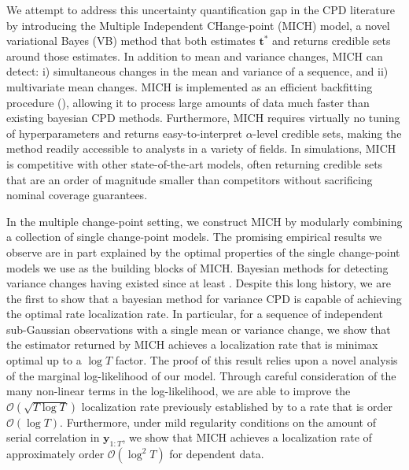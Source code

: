 
We attempt to address this uncertainty quantification gap in the CPD literature by introducing the Multiple Independent CHange-point (MICH) model, a novel variational Bayes (VB) method that both estimates $\mathbf{t}^*$ and returns credible sets around those estimates. In addition to mean and variance changes, MICH can detect: i) simultaneous changes in the mean and variance of a sequence, and ii) multivariate mean changes. MICH is implemented as an efficient backfitting procedure (\citealp{Friedman81, Breiman85}), allowing it to process large amounts of data much faster than existing bayesian CPD methods. Furthermore, MICH requires virtually no tuning of hyperparameters and returns easy-to-interpret $\alpha$-level credible sets, making the method readily accessible to analysts in a variety of fields. In simulations, MICH is competitive with other state-of-the-art models, often returning credible sets that are an order of magnitude smaller than competitors without sacrificing nominal coverage guarantees. 

In the multiple change-point setting, we construct MICH by modularly combining a collection of single change-point models. The promising empirical results we observe are in part explained by the optimal properties of the single change-point models we use as the building blocks of MICH. Bayesian methods for detecting variance changes having existed since at least \cite{Smith75}. Despite this long history, we are the first to show that a bayesian method for variance CPD is capable of achieving the optimal rate localization rate. In particular, for a sequence of independent sub-Gaussian observations with a single mean or variance change, we show that the estimator returned by MICH achieves a localization rate that is minimax optimal up to a $\log T$ factor. The proof of this result relies upon a novel analysis of the marginal log-likelihood of our model. Through careful consideration of the many non-linear terms in the log-likelihood, we are able to improve the $\mathcal{O}(\sqrt{T \log T})$ localization rate previously established by \cite{Cappello22} to a rate that is order $\mathcal{O}(\log T)$. Furthermore, under mild regularity conditions on the amount of serial correlation in $\mathbf{y}_{1:T}$, we show that MICH achieves a localization rate of approximately order $\mathcal{O}(\log^2 T)$ for dependent data.

